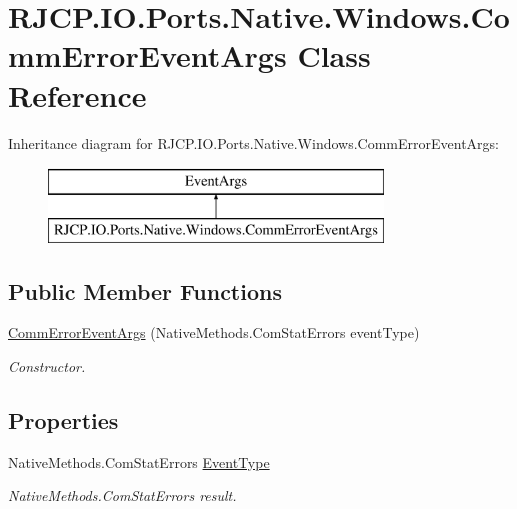 \hypertarget{class_r_j_c_p_1_1_i_o_1_1_ports_1_1_native_1_1_windows_1_1_comm_error_event_args}{}\section{R\+J\+C\+P.\+I\+O.\+Ports.\+Native.\+Windows.\+Comm\+Error\+Event\+Args Class Reference}
\label{class_r_j_c_p_1_1_i_o_1_1_ports_1_1_native_1_1_windows_1_1_comm_error_event_args}
Inheritance diagram for R\+J\+C\+P.\+I\+O.\+Ports.\+Native.\+Windows.\+Comm\+Error\+Event\+Args\+:\begin{figure}[H]
\begin{center}
\leavevmode
\includegraphics[height=2.000000cm]{class_r_j_c_p_1_1_i_o_1_1_ports_1_1_native_1_1_windows_1_1_comm_error_event_args}
\end{center}
\end{figure}
\subsection*{Public Member Functions}
\begin{DoxyCompactItemize}
\item 
\mbox{\hyperlink{class_r_j_c_p_1_1_i_o_1_1_ports_1_1_native_1_1_windows_1_1_comm_error_event_args_aa73731c402123c3fc97d2473d4c71367}{Comm\+Error\+Event\+Args}} (Native\+Methods.\+Com\+Stat\+Errors event\+Type)
\begin{DoxyCompactList}\small\item\em Constructor. \end{DoxyCompactList}\end{DoxyCompactItemize}
\subsection*{Properties}
\begin{DoxyCompactItemize}
\item 
Native\+Methods.\+Com\+Stat\+Errors \mbox{\hyperlink{class_r_j_c_p_1_1_i_o_1_1_ports_1_1_native_1_1_windows_1_1_comm_error_event_args_ab5711ddf002c5b1d804c26a0e6953da4}{Event\+Type}}
\begin{DoxyCompactList}\small\item\em Native\+Methods.\+Com\+Stat\+Errors result. \end{DoxyCompactList}\end{DoxyCompactItemize}


